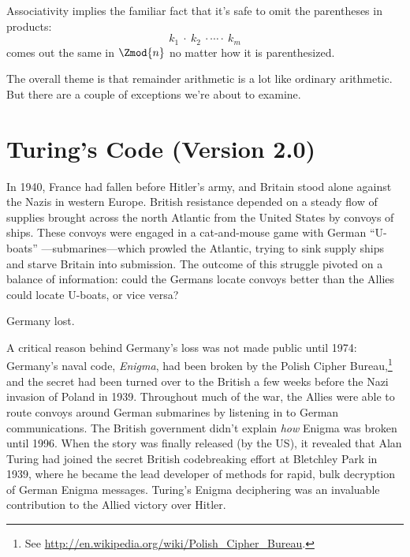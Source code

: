 Associativity implies the familiar fact that it's safe to omit the
parentheses in products:
\[
k_1\ \cdot\ k_2\ \cdot \cdots \cdot\ k_m
\]
comes out the same in $\Zmod{n}$ no matter how it is parenthesized.

The overall theme is that remainder arithmetic is a lot like ordinary
arithmetic.  But there are a couple of exceptions we're about to
examine.

\begin{problems}
\practiceproblems
{}

\homeworkproblems
{}

\classproblems
{}

\examproblems
{}

\end{problems}

\section{Turing's Code (Version 2.0)}

In 1940, France had fallen before Hitler's army, and Britain stood
alone against the Nazis in western Europe.  British resistance
depended on a steady flow of supplies brought across the north
Atlantic from the United States by convoys of ships.  These convoys
were engaged in a cat-and-mouse game with German ``U-boats''
---submarines---which prowled the Atlantic, trying to sink supply
ships and starve Britain into submission.  The outcome of this
struggle pivoted on a balance of information: could the Germans locate
convoys better than the Allies could locate U-boats, or vice versa?

Germany lost.

A critical reason behind Germany's loss was not made public until
1974: Germany's naval code, \emph{Enigma}, had been broken by the Polish Cipher
  Bureau,\footnote{See
  \href{http://www.bletchleypark.org.uk/content/hist/history/polish.rhtm}
       {http://en.wikipedia.org/wiki/Polish\_Cipher\_Bureau}.}  and
the secret had been turned over to the British a few weeks before the
Nazi invasion of Poland in 1939.  Throughout much of the war, the
Allies were able to route convoys around German submarines by
listening in to German communications.  The British government didn't
explain \emph{how} Enigma was broken until 1996.  When the story was
finally released (by the US), it revealed that Alan Turing had joined
the secret British codebreaking effort at Bletchley Park in 1939,
where he became the lead developer of methods for rapid, bulk
decryption of German Enigma messages.  Turing's Enigma deciphering was
an invaluable contribution to the Allied victory over Hitler.

